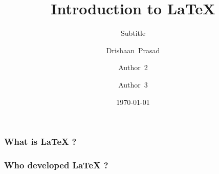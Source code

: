\documentclass{beamer}
\begin{document}
    \begin{frame}
        \title{Introduction to \LaTeX{}}
        \author{Drishaan~Prasad \and 
        Author~2 \and
        Author~3}
        \date{\today}
        \subtitle{Subtitle}
        \maketitle
    \end{frame}
    \begin{frame}
        \frametitle{What is LaTeX ?}
        \blindtext
    \end{frame}
    \begin{frame}
        \frametitle{Who developed LaTeX ?}
        \blindtext[1]
    \end{frame}
\end{document}
